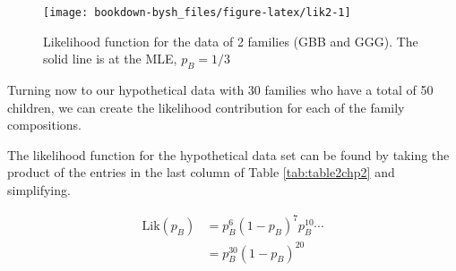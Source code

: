 \documentclass[
]{krantz}
\newcommand{\lik}{\mathrm{Lik}}
\begin{document}
\begin{figure}

{\centering \texttt{[image: bookdown-bysh\_files/figure-latex/lik2-1]} 

}

\caption{Likelihood function for the data of 2 families (GBB and GGG). The solid line is at the MLE,  ${p}_B=1/3$}\label{fig:lik2}
\end{figure}

Turning now to our hypothetical data with 30 families who have a total of 50 children, we can create the likelihood contribution for each of the family compositions.

\begin{table}

\caption{\label{tab:table2chp2}The likelihood factors for the hypothetical data set of n=50 children.}
\centering
{}
\end{table}

The likelihood function for the hypothetical data set can be found by taking the product of the entries in the last column of Table \ref{tab:table2chp2} and simplifying.

\begin{equation}
\begin{split}
 \lik(p_B) &= p_B^{6}(1-p_B)^{7}p_B^{10} \cdots \\
 &= p_B^{30}(1-p_B)^{20}
\end{split}
\label{eq:lik30} 
\end{equation}
\end{document}
